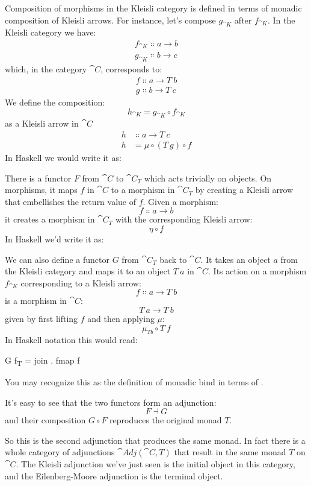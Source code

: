 Composition of morphisms in the Kleisli category is defined in terms of
monadic composition of Kleisli arrows. For instance, let's compose
$g_{\cat{K}}$ after $f_{\cat{K}}$. In the Kleisli category we have:
\begin{gather*}
f_{\cat{K}} \Colon a \to b \\
g_{\cat{K}} \Colon b \to c
\end{gather*}
which, in the category $\cat{C}$, corresponds to:
\begin{gather*}
f \Colon a \to T\ b \\
g \Colon b \to T\ c
\end{gather*}
We define the composition:
\[h_{\cat{K}} = g_{\cat{K}} \circ f_{\cat{K}}\]
as a Kleisli arrow in $\cat{C}$
\begin{align*}
h &\Colon a \to T\ c \\
h &= \mu \circ (T\ g) \circ f
\end{align*}
In Haskell we would write it as:

There is a functor $F$ from $\cat{C}$ to $\cat{C}_T$
which acts trivially on objects. On morphisms, it maps $f$ in
$\cat{C}$ to a morphism in $\cat{C}_T$ by creating a
Kleisli arrow that embellishes the return value of $f$. Given a
morphism:
\[f \Colon a \to b\]
it creates a morphism in $\cat{C}_T$ with the
corresponding Kleisli arrow:
\[\eta \circ f\]
In Haskell we'd write it as:

We can also define a functor $G$ from $\cat{C}_T$
back to $\cat{C}$. It takes an object $a$ from the Kleisli
category and maps it to an object $T\ a$ in $\cat{C}$. Its action
on a morphism $f_{\cat{K}}$ corresponding to a Kleisli arrow:
\[f \Colon a \to T\ b\]
is a morphism in $\cat{C}$:
\[T\ a \to T\ b\]
given by first lifting $f$ and then applying $\mu$:
\[\mu_{T b} \circ T\ f\]
In Haskell notation this would read:

\begin{snipv}
G f\textsubscript{T} = join . fmap f
\end{snipv}
You may recognize this as the definition of monadic bind in terms of
.

It's easy to see that the two functors form an adjunction:
\[F \dashv G\]
and their composition $G \circ F$ reproduces the original monad $T$.

So this is the second adjunction that produces the same monad. In fact
there is a whole category of adjunctions $\cat{Adj}(\cat{C}, T)$ that result
in the same monad $T$ on $\cat{C}$. The Kleisli adjunction we've
just seen is the initial object in this category, and the
Eilenberg-Moore adjunction is the terminal object.

